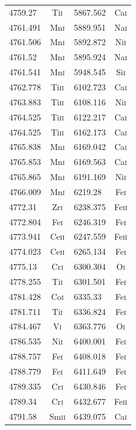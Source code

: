\begin{longtable}[c]{|l|c|l|c|}
4759.27 & Ti\textsc{i} & 5867.562 & Ca\textsc{i}\\   
4761.491 & Mn\textsc{i} & 5889.951 & Na\textsc{i}\\  
4761.506 & Mn\textsc{i} & 5892.872 & Ni\textsc{i}\\  
4761.52 & Mn\textsc{i} & 5895.924 & Na\textsc{i}\\   
4761.541 & Mn\textsc{i} & 5948.545 & Si\textsc{i}\\  
4762.778 & Ti\textsc{ii} & 6102.723 & Ca\textsc{i}\\ 
4763.883 & Ti\textsc{ii} & 6108.116 & Ni\textsc{i}\\ 
4764.525 & Ti\textsc{ii} & 6122.217 & Ca\textsc{i}\\ 
4764.525 & Ti\textsc{ii} & 6162.173 & Ca\textsc{i}\\ 
4765.838 & Mn\textsc{i} & 6169.042 & Ca\textsc{i}\\  
4765.853 & Mn\textsc{i} & 6169.563 & Ca\textsc{i}\\  
4765.865 & Mn\textsc{i} & 6191.169 & Ni\textsc{i}\\  
4766.009 & Mn\textsc{i} & 6219.28 & Fe\textsc{i}\\   
4772.31 & Zr\textsc{i} & 6238.375 & Fe\textsc{ii}\\  
4772.804 & Fe\textsc{i} & 6246.319 & Fe\textsc{i}\\  
4773.941 & Ce\textsc{ii} & 6247.559 & Fe\textsc{ii}\\
4774.023 & Ce\textsc{ii} & 6265.134 & Fe\textsc{i}\\ 
4775.13 & Cr\textsc{i} & 6300.304 & O\textsc{i}\\    
4778.255 & Ti\textsc{i} & 6301.501 & Fe\textsc{i}\\  
4781.428 & Co\textsc{i} & 6335.33 & Fe\textsc{i}\\   
4781.711 & Ti\textsc{i} & 6336.824 & Fe\textsc{i}\\  
4784.467 & V\textsc{i} & 6363.776 & O\textsc{i}\\    
4786.535 & Ni\textsc{i} & 6400.001 & Fe\textsc{i}\\  
4788.757 & Fe\textsc{i} & 6408.018 & Fe\textsc{i}\\  
4788.779 & Fe\textsc{i} & 6411.649 & Fe\textsc{i}\\  
4789.335 & Cr\textsc{i} & 6430.846 & Fe\textsc{i}\\  
4789.34 & Cr\textsc{i} & 6432.677 & Fe\textsc{ii}\\  
4791.58 & Sm\textsc{ii} & 6439.075 & Ca\textsc{i}\\  

\end{longtable}
